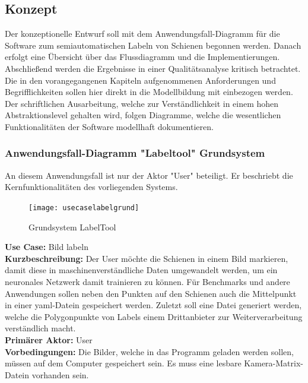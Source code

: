 \documentclass[11pt]{scrartcl}
\begin{document}
\subsection{Konzept}
\label{sec:Konzept}

Der konzeptionelle Entwurf soll mit dem Anwendungsfall-Diagramm für die Software zum semiautomatischen Labeln von Schienen begonnen werden. Danach erfolgt eine Übersicht über das Flussdiagramm und die Implementierungen. Abschließend werden die Ergebnisse in einer Qualitätsanalyse kritisch betrachtet. Die in den vorangegangenen Kapiteln aufgenommenen Anforderungen und Begrifflichkeiten sollen hier direkt in die Modellbildung mit einbezogen werden. Der schriftlichen Ausarbeitung, welche zur Verständlichkeit in einem hohen Abstraktionslevel gehalten wird, folgen Diagramme, welche die wesentlichen Funktionalitäten der Software modellhaft dokumentieren.

\subsubsection{Anwendungsfall-Diagramm "Labeltool" Grundsystem}
\label{sec:Anwendungsfall-Diagramm "Labeltool" Grundsystem}
An diesem Anwendungsfall ist nur der Aktor "User" beteiligt. Er beschriebt die Kernfunktionalitäten des vorliegenden Systems.

\begin{figure}[H]
  \texttt{[image: usecaselabelgrund]}
  \caption{Grundsystem LabelTool}
\end{figure}

\noindent
\textbf{Use Case:} Bild labeln
\\ 

\noindent
\textbf{Kurzbeschreibung:} Der User möchte die Schienen in einem Bild markieren, damit diese in maschinenverständliche Daten umgewandelt werden, um ein neuronales Netzwerk damit trainieren zu können. Für Benchmarks und andere Anwendungen sollen neben den Punkten auf den Schienen auch die Mittelpunkt in einer yaml-Datein gespeichert werden. Zuletzt soll eine Datei generiert werden, welche die Polygonpunkte von Labels einem Drittanbieter zur Weiterverarbeitung verständlich macht.
\\ 

\noindent
\textbf{Primärer Aktor:} User
\\ 

\noindent
\textbf{Vorbedingungen:} Die Bilder, welche in das Programm geladen werden sollen, müssen auf dem Computer gespeichert sein. Es muss eine lesbare Kamera-Matrix-Datein vorhanden sein. 
\\ 
\end{document}
